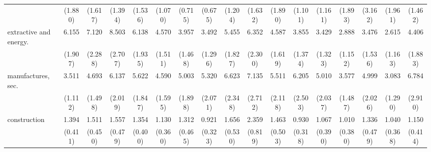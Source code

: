 {\begin{tabular}{l*{16}{c}}
                    &     (1.880)         &     (1.617)         &     (1.394)         &     (1.536)         &     (1.070)         &     (0.715)         &     (0.675)         &     (1.204)         &     (1.632)         &     (1.890)         &     (1.101)         &     (1.161)         &     (1.893)         &     (3.162)         &     (1.961)         &     (1.462)         \\
[1em]
extractive and energy.&       6.155\sym{***}&       7.120\sym{***}&       8.503\sym{***}&       6.138\sym{***}&       4.570\sym{***}&       3.957\sym{***}&       3.492\sym{***}&       5.455\sym{***}&       6.352\sym{***}&       4.587\sym{***}&       3.855\sym{***}&       3.429\sym{**} &       2.888\sym{**} &       3.476\sym{**} &       2.615\sym{*}  &       4.406\sym{***}\\
                    &     (1.907)         &     (2.288)         &     (2.707)         &     (1.935)         &     (1.511)         &     (1.468)         &     (1.296)         &     (1.827)         &     (2.300)         &     (1.619)         &     (1.374)         &     (1.323)         &     (1.152)         &     (1.536)         &     (1.163)         &     (1.883)         \\
[1em]
manufactures, sec.  &       3.511\sym{***}&       4.693\sym{***}&       6.137\sym{***}&       5.622\sym{***}&       4.590\sym{***}&       5.003\sym{***}&       5.320\sym{***}&       6.623\sym{***}&       7.135\sym{***}&       5.511\sym{***}&       6.205\sym{***}&       5.010\sym{***}&       3.577\sym{**} &       4.999\sym{***}&       3.083\sym{**} &       6.784\sym{***}\\
                    &     (1.112)         &     (1.498)         &     (2.019)         &     (1.847)         &     (1.595)         &     (1.898)         &     (2.071)         &     (2.348)         &     (2.712)         &     (2.118)         &     (2.503)         &     (2.037)         &     (1.487)         &     (2.026)         &     (1.290)         &     (2.910)         \\
[1em]
construction        &       1.394         &       1.511         &       1.557         &       1.354         &       1.130         &       1.312         &       0.921         &       1.656         &       2.359\sym{*}  &       1.463         &       0.930         &       1.067         &       1.010         &       1.336         &       1.040         &       1.150         \\
                    &     (0.411)         &     (0.450)         &     (0.479)         &     (0.400)         &     (0.360)         &     (0.465)         &     (0.323)         &     (0.530)         &     (0.819)         &     (0.503)         &     (0.318)         &     (0.390)         &     (0.380)         &     (0.479)         &     (0.368)         &     (0.414)         \\

\end{tabular}}
